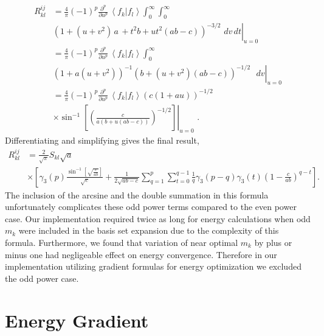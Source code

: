 \documentclass[12pt]{article}
\begin{document}
\begin{align}
R_{kl}^{ij} &  =\frac{4}{\pi}\left(  -1\right)  ^{p}\frac{\partial^{p}%
}{\partial u^{p}}\,\left\langle f_{k}\right.  |\left.  f_{l}\right\rangle
\int_{0}^{\infty}\int_{0}^{\infty}\nonumber\\
&  \left.  \left(  1+\left(  u+v^{2}\right)  \,a\,+t^{2}b+ut^{2}\left(
ab-c\right)  \right)  ^{-3/2}\mathbf{\,}\,dv\,dt\right|  _{u=0}\nonumber\\
&  =\frac{4}{\pi}\left(  -1\right)  ^{p}\frac{\partial^{p}}{\partial u^{p}%
}\,\left\langle f_{k}\right.  |\left.  f_{l}\right\rangle \int_{0}^{\infty
}\nonumber\\
&  \left.  \left(  1+a\left(  u+v^{2}\right)  \right)  ^{-1}\left(  b+\left(
u+v^{2}\right)  \left(  ab-c\right)  \right)  ^{-1/2}\mathbf{\,}%
\,\,\,dv\right|  _{u=0}\nonumber\\
&  =\frac{4}{\pi}\left(  -1\right)  ^{p}\frac{\partial^{p}}{\partial u^{p}%
}\,\left\langle f_{k}\right.  |\left.  f_{l}\right\rangle \left(  c\left(
1+au\right)  \right)  ^{-1/2}\nonumber\\
&  \left.  \times\sin^{-1}\left[  \left(  \frac{c}{a\left(  b+u\left(
ab-c\right)  \right)  }\right)  ^{-1/2}\right]  \right|  _{u=0}\mathbf{\,}\,.
\end{align}
Differentiating and simplifying gives the final result,
\begin{align}
R_{kl}^{ij} &  =\frac{2}{\sqrt{\pi}}S_{kl}\sqrt{a}\nonumber\\
&  \times\left[  \gamma_{3}\left(  p\right)  \frac{\sin^{-1}\left[
\sqrt{\frac{c}{ab}}\right]  }{\sqrt{c}}+\frac{1}{2\sqrt{ab-c}}\sum_{q=1}%
^{p}\sum_{t=0}^{q-1}\frac{1}{q}\gamma_{3}\left(  p-q\right)  \gamma_{3}\left(
t\right)  \left(  1-\frac{c}{ab}\right)  ^{q-t}\right]  .\label{Rklodd}%
\end{align}
The inclusion of the arcsine and the double summation in this formula
unfortunately complicates these odd power terms compared to the even power
case. Our implementation required twice as long for energy calculations when
odd $m_{k}$ were included in the basis set expansion due to the complexity of
this formula. Furthermore, we found that variation of near optimal $m_{k}$ by
plus or minus one had negligeable effect on energy convergence. Therefore in
our implementation utilizing gradient formulas for energy optimization we
excluded the odd power case.

\section{Energy Gradient}
\end{document}
